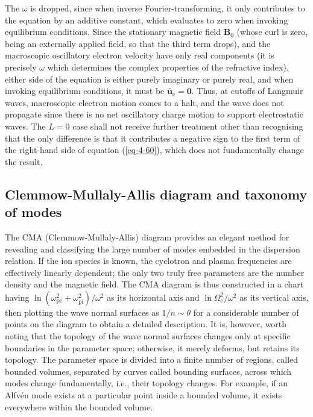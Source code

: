 The $\omega$ is dropped, since when inverse Fourier-transforming, it only contributes to the equation by an additive constant, which evaluates to zero when invoking equilibrium conditions. Since the stationary magnetic field $\mathbf{B}_0$ (whose curl is zero, being an externally applied field, so that the third term drops), and the macroscopic oscillatory electron velocity have only real components (it is precisely $\omega$ which determines the complex properties of the refractive index), either side of the equation is either purely imaginary or purely real, and when invoking equilibrium conditions, it must be $\bar{\mathbf{u}}_\text{e}=\mathbf{0}$. Thus, at cutoffs of Langmuir waves, macroscopic electron motion comes to a halt, and the wave does not propagate since there is no net oscillatory charge motion to support electrostatic waves. The $L=0$ case shall not receive further treatment other than recognising that the only difference is that it contributes a negative sign to the first term of the right-hand side of equation (\ref{eq-4-60}), which does not fundamentally change the result.

\subsection{Clemmow-Mullaly-Allis diagram and taxonomy of modes}

The CMA (Clemmow-Mullaly-Allis) diagram provides an elegant method for revealing and classifying the large number of modes embedded in the dispersion relation. If the ion species is known, the cyclotron and plasma frequencies are effectively linearly dependent; the only two truly free parameters are the number density and the magnetic field. The CMA diagram is thus constructed in a chart having $\ln{(\omega_\text{pe}^2+\omega_\text{pi}^2)/\omega^2}$ as its horizontal axis and $\ln{\Omega_\text{e}^2/\omega^2}$ as its vertical axis, then plotting the wave normal surfaces as $1/n\sim\theta$ for a considerable number of points on the diagram to obtain a detailed description. It is, however, worth noting that the topology of the wave normal surfaces changes only at specific boundaries in the parameter space; otherwise, it merely deforms, but retains its topology. The parameter space is divided into a finite number of regions, called bounded volumes, separated by curves called bounding surfaces, across which modes change fundamentally, i.e., their topology changes. For example, if an Alfvén mode exists at a particular point inside a bounded volume, it exists everywhere within the bounded volume.

